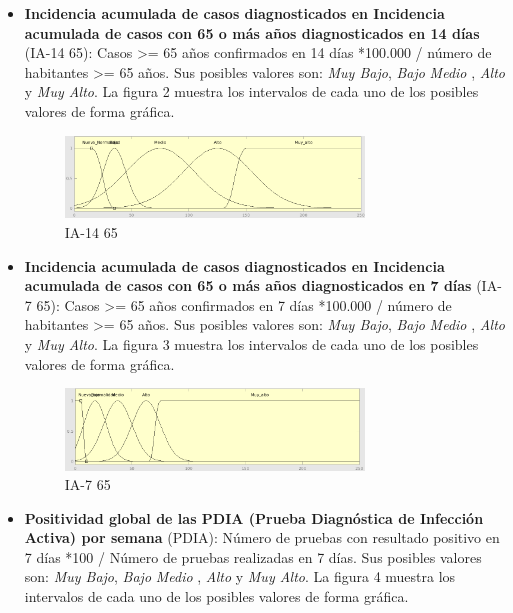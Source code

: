\documentclass[12pt,a4paper, xcolor=table]{article}
\begin{document}
\begin{itemize}
    \item \textbf{Incidencia acumulada de casos diagnosticados en Incidencia acumulada de casos con 65 o más años diagnosticados en 14 días} (IA-14 65): Casos >= 65 años confirmados en 14 días *100.000 / número de habitantes >= 65 años. Sus posibles valores son: \textit{Muy Bajo}, \textit{Bajo} \textit{Medio }, {\textit{Alto}} y {\textit{Muy Alto}}. La figura 2 muestra los intervalos de cada uno de los posibles valores de forma gráfica.

    \begin{figure}[!h]
      \centering
      \includegraphics[width=300px]{img/ia_65_14.png}
      \caption{IA-14 65}
      \label{IA-14 65}
    \end{figure}

    \item \textbf{Incidencia acumulada de casos diagnosticados en Incidencia acumulada de casos con 65 o más años diagnosticados en 7 días} (IA-7 65): Casos >= 65 años confirmados en 7 días *100.000 / número de habitantes >= 65 años. Sus posibles valores son: \textit{Muy Bajo}, \textit{Bajo} \textit{Medio }, {\textit{Alto}} y {\textit{Muy Alto}}. La figura 3 muestra los intervalos de cada uno de los posibles valores de forma gráfica.

    \begin{figure}[!h]
      \centering
      \includegraphics[width=300px]{img/ia_65_7.png}
      \caption{IA-7 65}
      \label{IA-7 65}
    \end{figure}

    \item \textbf{Positividad global de las PDIA (Prueba Diagnóstica de Infección Activa) por semana} (PDIA): Número de pruebas con resultado positivo en 7 días *100 / Número de pruebas realizadas en 7 días. Sus posibles valores son: \textit{Muy Bajo}, \textit{Bajo} \textit{Medio }, {\textit{Alto}} y {\textit{Muy Alto}}. La figura 4 muestra los intervalos de cada uno de los posibles valores de forma gráfica.


\end{itemize}
\end{document}
